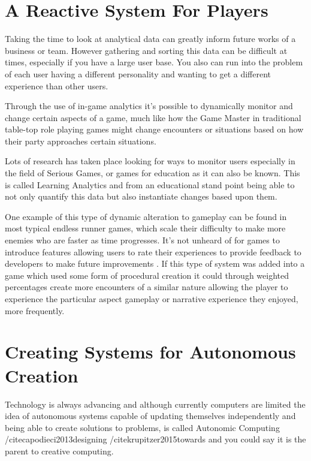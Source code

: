 \documentclass{scrartcl}
\begin{document}
\section{A Reactive System For Players}

Taking the time to look at analytical data can greatly inform future works of a business or team. However gathering and sorting this data can be difficult at times, especially if you have a large user base. You also can run into the problem of each user having a different personality and wanting to get a different experience than other users.

Through the use of in-game analytics it's possible to dynamically monitor and change certain aspects of a game, much like how the Game Master in traditional table-top role playing games might change encounters or situations based on how their party approaches certain situations. 

Lots of research has taken place looking for ways to monitor users especially in the field of Serious Games, or games for education as it can also be known. \cite{shute2009melding} \cite{hauge2014implications} This is called Learning Analytics \cite{fournier2011value} and from an educational stand point being able to not only quantify this data but also instantiate changes based upon them.

One example of this type of dynamic alteration to gameplay can be found in most typical endless runner games, which scale their difficulty to make more enemies who are faster as time progresses. It's not unheard of for games to introduce features allowing users to rate their experiences to provide feedback to developers to make future improvements \cite{ubisoft2013assassins}. If this type of system was added into a game which used some form of procedural creation it could through weighted percentages create more encounters of a similar nature allowing the player to experience the particular aspect gameplay or narrative experience they enjoyed, more frequently.

\section{Creating Systems for Autonomous Creation}

Technology is always advancing and although currently computers are limited the idea of autonomous systems capable of updating themselves independently and being able to create solutions to problems, is called Autonomic Computing \cite{viroli2016combining} /cite{capodieci2013designing} /cite{krupitzer2015towards} and you could say it is the parent to creative computing. 
\end{document}
